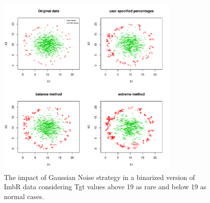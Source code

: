 \documentclass[10pt,a4paper]{article}\usepackage[]{graphicx}\usepackage[]{color}
\newenvironment{knitrout}{}{} %
\begin{document}
\begin{knitrout}\footnotesize
{}\color{fgcolor}\begin{figure}

{\centering \includegraphics[width=0.8\textwidth]{figures/UBL-GN_plot2-1} 

}

\caption[The impact of Gaussian Noise strategy in a binarized version of ImbR data considering Tgt values above 19 as rare and below 19 as normal cases]{The impact of Gaussian Noise strategy in a binarized version of ImbR data considering Tgt values above 19 as rare and below 19 as normal cases.}\label{fig:GN_plot2}
\end{figure}


\end{knitrout}
\end{document}
